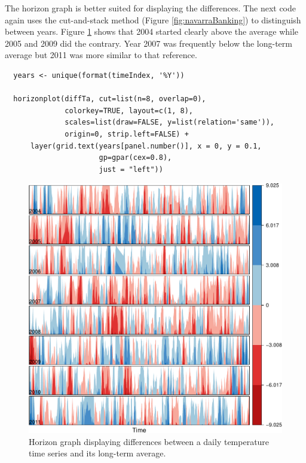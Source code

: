 \documentclass[smallroyalvopaper]{memoir}
\begin{document}
The horizon graph is better suited for displaying the differences. The
next code again uses the cut-and-stack method (Figure
\ref{fig:navarraBanking}) to distinguish between years. Figure
\ref{fig:diffTa_horizon} shows that 2004 started clearly above the
average while 2005 and 2009 did the contrary. Year 2007 was frequently
below the long-term average but 2011 was more similar to that
reference.
\lstset{language=r,label= ,caption= ,captionpos=b,numbers=none}
\begin{lstlisting}
  years <- unique(format(timeIndex, '%Y'))
  
  horizonplot(diffTa, cut=list(n=8, overlap=0),
              colorkey=TRUE, layout=c(1, 8),
              scales=list(draw=FALSE, y=list(relation='same')),
              origin=0, strip.left=FALSE) +
      layer(grid.text(years[panel.number()], x = 0, y = 0.1, 
                      gp=gpar(cex=0.8),
                      just = "left"))
\end{lstlisting}

\begin{figure}[htbp]
\centering
\includegraphics[width=.9\linewidth]{figs/diffTa_horizon.pdf}
\caption{Horizon graph displaying differences between a daily temperature time series and its long-term average. \label{fig:diffTa_horizon}}
\end{figure}
\end{document}

